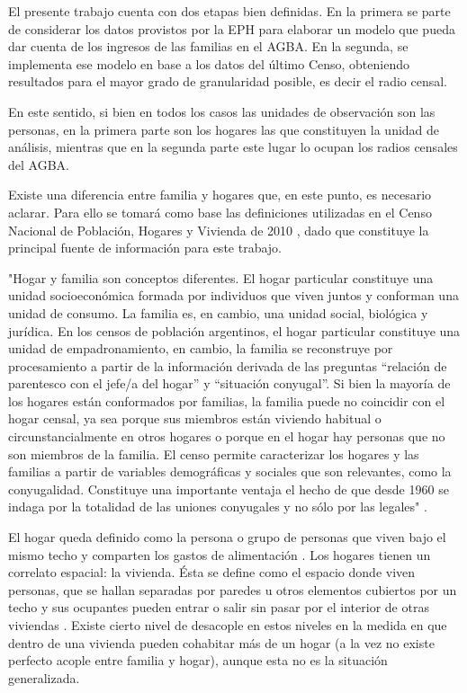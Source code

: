 El presente trabajo cuenta con dos etapas bien definidas. En la primera se parte de considerar los datos provistos por la EPH para elaborar un modelo que pueda dar cuenta de los ingresos de las familias en el AGBA. En la segunda, se implementa ese modelo en base a los datos del último Censo, obteniendo resultados para el mayor grado de granularidad posible, es decir el radio censal.

En este sentido, si bien en todos los casos las unidades de observación son las personas, en la primera parte son los hogares las que constituyen la unidad de análisis, mientras que en la segunda parte este lugar lo ocupan los radios censales del AGBA. 
	
Existe una diferencia entre familia y hogares que, en este punto, es necesario aclarar. Para ello se tomará como base las definiciones utilizadas en el Censo Nacional de Población, Hogares y Vivienda de 2010 \cite{indec2012}, dado que constituye la principal fuente de información para este trabajo. 

"Hogar y familia son conceptos diferentes. El hogar particular constituye una unidad socioeconómica formada por individuos que viven juntos y conforman una unidad de consumo. La familia es, en cambio, una unidad social, biológica y jurídica. En los censos de población argentinos, el hogar particular constituye una unidad de empadronamiento, en cambio, la familia se reconstruye por procesamiento a partir de la información derivada de las preguntas “relación de parentesco con el jefe/a del hogar” y “situación conyugal”. Si bien la mayoría de los hogares están conformados por familias, la familia puede no coincidir con el hogar censal, ya sea porque sus miembros están viviendo habitual o circunstancialmente en otros hogares o porque en el hogar hay personas que no son miembros de la familia. El censo permite caracterizar los hogares y las familias a partir de variables demográficas y sociales que son relevantes, como la conyugalidad. Constituye una importante ventaja el hecho de que desde 1960 se indaga por la totalidad de las uniones conyugales y no sólo por las legales" \cite[p~38]{indec2012}.

El hogar queda definido como la persona o grupo de personas que viven bajo el mismo techo y comparten los gastos de alimentación \cite[p~334]{indec2012}. Los hogares tienen un correlato espacial: la vivienda. Ésta se define como el espacio donde viven personas, que se hallan separadas por paredes u otros elementos cubiertos por un techo y sus ocupantes pueden entrar o salir sin pasar por el interior de otras viviendas \cite[p~338]{indec2012}. Existe cierto nivel de desacople en estos niveles en la medida en que dentro de una vivienda pueden cohabitar más de un hogar (a la vez no existe perfecto acople entre familia y hogar), aunque esta no es la situación generalizada.
	
